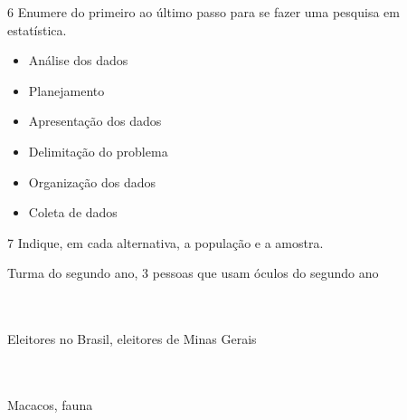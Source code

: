 
\num{6} Enumere do primeiro ao último passo para se fazer uma pesquisa em
estatística.

\begin{itemize}

    \item{Análise dos dados} 

    \item{Planejamento} 

    \item{Apresentação dos dados} 

    \item{Delimitação do problema} 

    \item{Organização dos dados} 

    \item{Coleta de dados} 

\end{itemize}

\num{7} Indique, em cada alternativa, a população e a amostra.

\begin{escolha}

\item Turma do segundo ano, 3 pessoas que usam óculos do segundo ano \\

 \\ \\

\item Eleitores no Brasil, eleitores de Minas Gerais \\

 \\ \\

\item Macacos, fauna \\

 \\ \\

\end{escolha}

